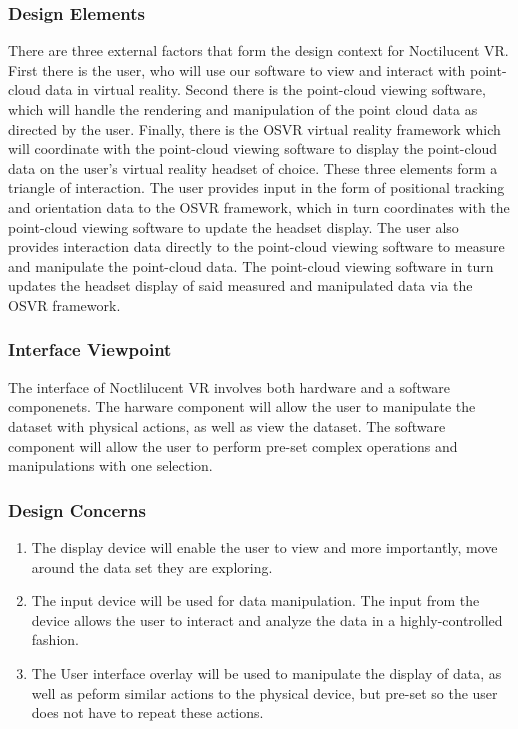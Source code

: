 \subsubsection{Design Elements}

There are three external factors that form the design context for Noctilucent VR. 
First there is the user, who will use our software to view and interact with point-cloud data in virtual reality. 
Second there is the point-cloud viewing software, which will handle the rendering and manipulation of the point cloud data as directed by the user. 
Finally, there is the OSVR virtual reality framework which will coordinate with the point-cloud viewing software to display the point-cloud data on the user’s virtual reality headset of choice. 
These three elements form a triangle of interaction. 
The user provides input in the form of positional tracking and orientation data to the OSVR framework, which in turn coordinates with the point-cloud viewing software to update the headset display. 
The user also provides interaction data directly to the point-cloud viewing software to measure and manipulate the point-cloud data. 
The point-cloud viewing software in turn updates the headset display of said measured and manipulated data via the OSVR framework.

\subsubsection{Interface Viewpoint}

The interface of Noctlilucent VR involves both hardware and a software componenets. 
The harware component will allow the user to manipulate the dataset with physical actions,
as well as view the dataset.
The software component will allow the user to perform pre-set complex operations and manipulations
with one selection. 

\subsubsection{Design Concerns}
\begin{enumerate}
\item The display device will enable the user to view and more importantly, move around the data set
    they are exploring.
\item The input device will be used for data manipulation. The input from the device allows the user to interact and analyze the
    data in a highly-controlled fashion.
\item The User interface overlay will be used to manipulate the display of data, as well as peform similar actions to the physical device,
    but pre-set so the user does not have to repeat these actions.
\end{enumerate}
